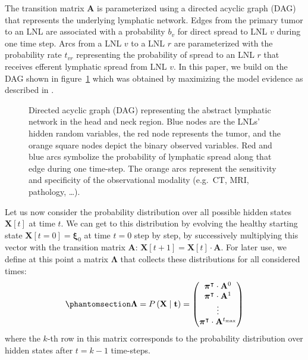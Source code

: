\documentclass[
  sn-mathphys-num,
]{sn-jnl}
\begin{document}
The transition matrix \(\mathbf{A}\) is parameterized using a directed
acyclic graph (DAG) that represents the underlying lymphatic network.
Edges from the primary tumor to an LNL are associated with a probability
\(b_v\) for direct spread to LNL \(v\) during one time step. Arcs from a
LNL \(v\) to a LNL \(r\) are parameterized with the probability rate
\(t_{vr}\) representing the probability of spread to an LNL \(r\) that
receives efferent lymphatic spread from LNL \(v\). In this paper, we
build on the DAG shown in figure~\ref{fig-full-graph} which was obtained
by maximizing the model evidence as described in
\citep{ludwig_modelling_2024}.

\begin{figure}

\centering{



}

\caption{\label{fig-full-graph}Directed acyclic graph (DAG) representing
the abstract lymphatic network in the head and neck region. Blue nodes
are the LNLs' hidden random variables, the red node represents the
tumor, and the orange square nodes depict the binary observed variables.
Red and blue arcs symbolize the probability of lymphatic spread along
that edge during one time-step. The orange arcs represent the
sensitivity and specificity of the observational modality (e.g.~CT, MRI,
pathology, \ldots).}

\end{figure}%

Let us now consider the probability distribution over all possible
hidden states \(\mathbf{X}[t]\) at time \(t\). We can get to this
distribution by evolving the healthy starting state
\(\mathbf{X}[t=0] = \boldsymbol{\xi}_0\) at time \(t=0\) step by step,
by successively multiplying this vector with the transition matrix
\(\mathbf{A}\): \(\mathbf{X}[t+1] = \mathbf{X}[t] \cdot \mathbf{A}\).
For later use, we define at this point a matrix \(\boldsymbol{\Lambda}\)
that collects these distributions for all considered times:
%
\begin{equation}\phantomsection\label{eq-lambda-matrix}{
\boldsymbol{\Lambda} = P \left( \mathbf{X} \mid \mathbf{t} \right) = \begin{pmatrix}
\boldsymbol{\pi}^\intercal \cdot \mathbf{A}^0 \\
\boldsymbol{\pi}^\intercal \cdot \mathbf{A}^1 \\
\vdots \\
\boldsymbol{\pi}^\intercal \cdot \mathbf{A}^{t_\text{max}} \\
\end{pmatrix}
}\end{equation}
%
where the \(k\)-th row in this matrix corresponds to the probability
distribution over hidden states after \(t=k-1\) time-steps.
\end{document}
